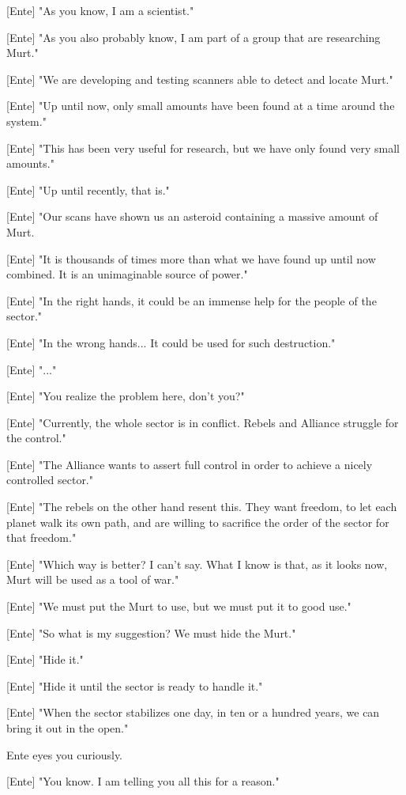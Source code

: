 \documentclass[a4paper,12pt]{article}
\begin{document}
[Ente] "As you know, I am a scientist." 

[Ente] "As you also probably know, I am part of a group that are researching Murt."

[Ente] "We are developing and testing scanners able to detect and locate Murt."

[Ente] "Up until now, only small amounts have been found at a time around the system." 

[Ente] "This has been very useful for research, but we have only found very small amounts."

[Ente] "Up until recently, that is." 

[Ente] "Our scans have shown us an asteroid containing a massive amount of Murt. 

[Ente] "It is thousands of times more than what we have found up until now combined. It is an unimaginable source of power."

[Ente] "In the right hands, it could be an immense help for the people of the sector."

[Ente] "In the wrong hands... It could be used for such destruction."

[Ente] "..."

[Ente] "You realize the problem here, don't you?"

[Ente] "Currently, the whole sector is in conflict. Rebels and Alliance struggle for the control."

[Ente] "The Alliance wants to assert full control in order to achieve a nicely controlled sector."

[Ente] "The rebels on the other hand resent this. They want freedom, to let each planet walk its own path, and
are willing to sacrifice the order of the sector for that freedom."

[Ente] "Which way is better? I can't say. What I know is that, as it looks now, Murt will be used as a tool of war."

[Ente] "We must put the Murt to use, but we must put it to good use."

[Ente] "So what is my suggestion? We must hide the Murt." 

[Ente] "Hide it." 

[Ente] "Hide it until the sector is ready to handle it."

[Ente] "When the sector stabilizes one day, in ten or a hundred years, we can bring it out in the open."

Ente eyes you curiously.

[Ente] "You know. I am telling you all this for a reason." 
\end{document}
